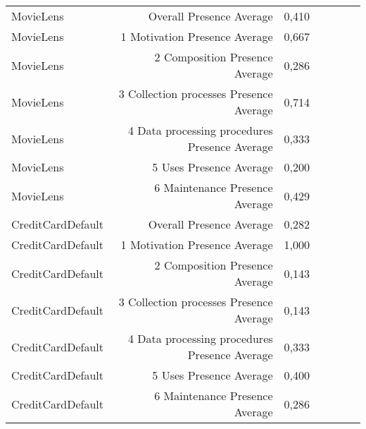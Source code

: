 \begin{table}[t]
\begin{tabular}{|p{2cm}|r|r|r|r|r|r|}
MovieLens & Overall Presence Average & 0,410\cellcolor[HTML]{FDBEAB}\\
MovieLens & 1 Motivation Presence Average & 0,667\cellcolor[HTML]{FEDAD0}\\
MovieLens & 2 Composition Presence Average & 0,286\cellcolor[HTML]{FCB19A}\\
MovieLens & 3 Collection processes Presence Average & 0,714\cellcolor[HTML]{FEDFD6}\\
MovieLens & 4 Data processing procedures Presence Average & 0,333\cellcolor[HTML]{FCB6A0}\\
MovieLens & 5 Uses Presence Average & 0,200\cellcolor[HTML]{FCA78E}\\
MovieLens & 6 Maintenance Presence Average & 0,429\cellcolor[HTML]{FDC0AE}\\
CreditCardDefault & Overall Presence Average & 0,282\cellcolor[HTML]{FCB099}\\
CreditCardDefault & 1 Motivation Presence Average & 1,000\cellcolor[HTML]{FFFFFF}\\
CreditCardDefault & 2 Composition Presence Average & 0,143\cellcolor[HTML]{FCA186}\\
CreditCardDefault & 3 Collection processes Presence Average & 0,143\cellcolor[HTML]{FCA186}\\
CreditCardDefault & 4 Data processing procedures Presence Average & 0,333\cellcolor[HTML]{FCB6A0}\\
CreditCardDefault & 5 Uses Presence Average & 0,400\cellcolor[HTML]{FDBDAA}\\
CreditCardDefault & 6 Maintenance Presence Average & 0,286\cellcolor[HTML]{FCB19A}\\
\hline
\end{tabular}
\end{table}
